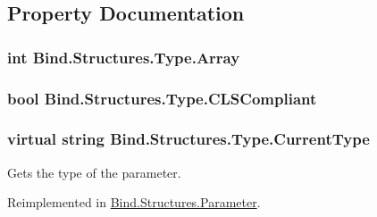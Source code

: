 \subsection{Property Documentation}
\hypertarget{class_bind_1_1_structures_1_1_type_a8446ccbe46981c6c1aa540b1151f8be2}{
\subsubsection[{Array}]{\setlength{\rightskip}{0pt plus 5cm}int Bind.Structures.Type.Array}}
\label{class_bind_1_1_structures_1_1_type_a8446ccbe46981c6c1aa540b1151f8be2}
\hypertarget{class_bind_1_1_structures_1_1_type_a15f810ed11402d3b4dbd44ab338013c0}{
\subsubsection[{CLSCompliant}]{\setlength{\rightskip}{0pt plus 5cm}bool Bind.Structures.Type.CLSCompliant}}
\label{class_bind_1_1_structures_1_1_type_a15f810ed11402d3b4dbd44ab338013c0}
\hypertarget{class_bind_1_1_structures_1_1_type_ae54c82fec549fa18561c2ff88d5615ca}{
\subsubsection[{CurrentType}]{\setlength{\rightskip}{0pt plus 5cm}virtual string Bind.Structures.Type.CurrentType}}
\label{class_bind_1_1_structures_1_1_type_ae54c82fec549fa18561c2ff88d5615ca}


Gets the type of the parameter. 



Reimplemented in \hyperlink{class_bind_1_1_structures_1_1_parameter_ae1988456271db83da3197856b8ac88a8}{Bind.Structures.Parameter}.

